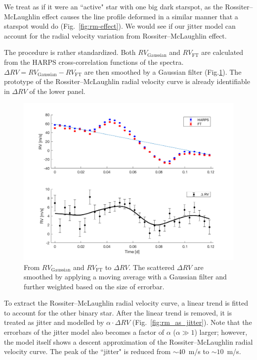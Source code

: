 We treat as if it were an ``active" star with one big dark starspot, as the Rossiter–McLaughlin effect 
causes the line profile deformed in a similar manner that a starspot would do (Fig.~\ref{fig:rm-effect}). 
We would see if our jitter model can account for the radial velocity variation from Rossiter–McLaughlin effect. 

The procedure is rather standardized. Both $RV_\text{Gaussian}$ and $RV_\text{FT}$ are calculated from the 
HARPS cross-correlation functions of the spectra. $\Delta RV = RV_\text{Gaussian} - RV_\text{FT}$ are then 
smoothed by a Gaussian filter (Fig.\ref{fig:hot_to_delta_rv}). The prototype of the Rossiter–McLaughlin
radial velocity curve is already identifiable in $\Delta RV$ of the lower panel. 

\begin{figure}[tbp]
\centering
\includegraphics[width = 0.80 \linewidth]
{./Figures/Methods/8-Proto_jitter2.png}
\caption[From $RV_\text{Gaussian}$ and $RV_\text{FT}$ to $Delta RV$]
{From $RV_\text{Gaussian}$ and $RV_\text{FT}$ to $\Delta RV$. The scattered $\Delta RV$ are smoothed by applying 
a moving average with a Gaussian filter and  further weighted based on the size of errorbar.} 
\label{fig:hot_to_delta_rv}
\end{figure} 

To extract the Rossiter–McLaughlin radial velocity curve, a linear trend is fitted to account for the 
other binary star. After the linear trend is removed, it is treated as jitter and modelled 
by $\alpha \cdot \Delta RV$ (Fig.~\ref{fig:rm_as_jitter}). 
Note that the errorbars of the jitter model also becomes a factor of $\alpha$ ($\alpha\gg 1$) larger; 
however, the model itself shows a descent approximation 
of the Rossiter–McLaughlin radial velocity curve. The peak of the ``jitter" is reduced from $\sim 40$~m/s to $\sim 10$~m/s. 

